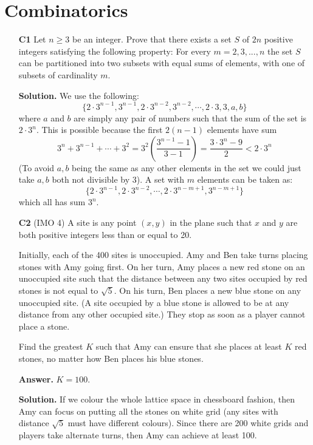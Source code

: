 \documentclass[11pt,a4paper]{article}
\begin{document}
\section*{Combinatorics}
\begin{enumerate}
	\item[\textbf{C1}] Let $n\geqslant 3$ be an integer. Prove that there exists a set $S$ of $2n$ positive integers satisfying the following property: For every $m=2,3,...,n$ the set $S$ can be partitioned into two subsets with equal sums of elements, with one of subsets of cardinality $m$.
	
	\textbf{Solution.} 
	We use the following: 
	\[
	\{2\cdot 3^{n-1}, 3^{n-1}, 2\cdot 3^{n-2}, 3^{n-2}, \cdots , 2\cdot 3, 3, a, b\}
	\]
	where $a$ and $b$ are simply any pair of numbers such that the sum of the set is $2\cdot 3^n$. This is possible because the first $2(n-1)$ elements have sum 
	\[
	3^n+3^{n-1}+\cdots + 3^2 = 3^2(\frac{3^{n-1}-1}{3-1})=\frac{3\cdot 3^{n}-9}{2}<2\cdot 3^n
	\]
	(To avoid $a, b$ being the same as any other elements in the set we could just take $a, b$ both not divisible by 3). 
	A set with $m$ elements can be taken as: 
	\[
	\{2\cdot 3^{n-1}, 2\cdot 3^{n-2}, \cdots , 2\cdot 3^{n-m+1}, 3^{n-m+1}\}
	\]
	which all has sum $3^n$. 
	
	\item[\textbf{C2}] (IMO 4) 
	A site is any point $(x, y)$ in the plane such that $x$ and $y$ are both positive integers less than or equal to 20.
	
	Initially, each of the 400 sites is unoccupied. Amy and Ben take turns placing stones with Amy going first. On her turn, Amy places a new red stone on an unoccupied site such that the distance between any two sites occupied by red stones is not equal to $\sqrt{5}$. On his turn, Ben places a new blue stone on any unoccupied site. (A site occupied by a blue stone is allowed to be at any distance from any other occupied site.) They stop as soon as a player cannot place a stone.
	
	Find the greatest $K$ such that Amy can ensure that she places at least $K$ red stones, no matter how Ben places his blue stones.
	
	\textbf{Answer.} $K=100$. 
	
	\textbf{Solution.} 
	If we colour the whole lattice space in chessboard fashion, then Amy can focus on putting all the stones on white grid (any sites with distance $\sqrt{5}$ must have different colours). 
	Since there are 200 white grids and players take alternate turns, then Amy can achieve at least 100. 
	

\end{enumerate}
\end{document}
